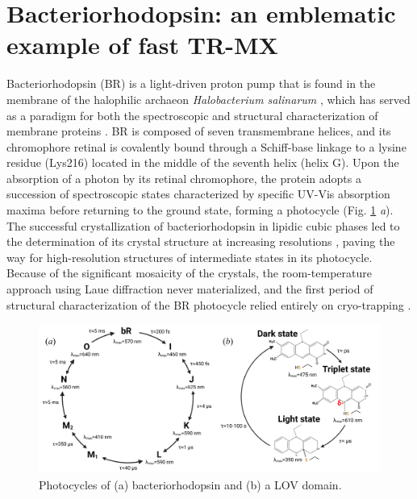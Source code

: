 \section{Bacteriorhodopsin: an emblematic example of fast TR-MX}\label{sec:BR}

Bacteriorhodopsin (BR) is a light-driven proton pump that is found in the membrane of the halophilic archaeon \textit{Halobacterium salinarum} \parencite{oesterheltRhodopsinlikeProteinPurple1971}, which has served as a paradigm for both the spectroscopic and structural characterization of membrane proteins \parencite{ottolenghiPhotophysicsPhotochemistryRetinal1995,hauptsCLOSINGBACTERIORHODOPSINProgress1999}. BR is composed of seven transmembrane helices, and its chromophore retinal is covalently bound through a Schiff-base linkage to a lysine residue (Lys216) located in the middle of the seventh helix (helix G). Upon the absorption of a photon by its retinal chromophore, the protein adopts a succession of spectroscopic states characterized by specific UV-Vis absorption maxima before returning to the ground state, forming a photocycle (Fig. \ref{fig:Figure4} \textit{a}). The successful crystallization of bacteriorhodopsin in lipidic cubic phases \parencite{landauLipidicCubicPhases1996} led to the determination of its crystal structure at increasing resolutions \parencite{pebay-peyroulaXrayStructureBacteriorhodopsin1997, beitlichCryoradiolyticReductionCrystalline2007}, paving the way for high-resolution structures of intermediate states in its photocycle. Because of the significant mosaicity of the crystals, the room-temperature approach using Laue diffraction never materialized, and the first period of structural characterization of the BR photocycle relied entirely on cryo-trapping \parencite{wickstrandBacteriorhodopsinWouldReal2015}.
\begin{figure}[H] %
    \centering
    \noindent \includegraphics[width=\textwidth]{images/Introduction/Figure4_photocycles.pdf}
    \hfill
    \caption{Photocycles of (a) bacteriorhodopsin and (b) a LOV domain. }
    \label{fig:Figure4}
\end{figure}

